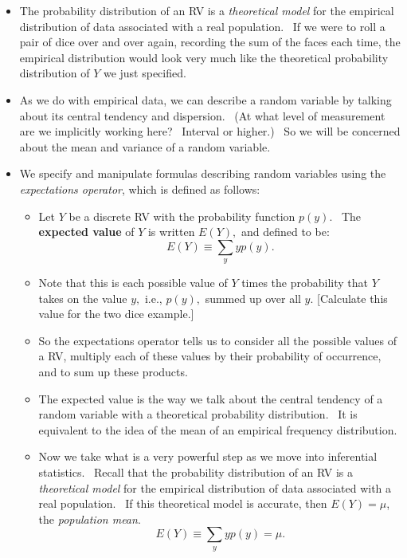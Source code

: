 \documentclass[11pt]{article}
\begin{document}
\begin{itemize}
\item The probability distribution of an RV is a \textit{theoretical model }%
for the empirical distribution of data associated with a real population. \
If we were to roll a pair of dice over and over again, recording the sum of
the faces each time, the empirical distribution would look very much like
the theoretical probability distribution of $Y$ we just specified.

\item As we do with empirical data, we can describe a random variable by
talking about its central tendency and dispersion. \ (At what level of
measurement are we implicitly working here? \ Interval or higher.) \ So we
will be concerned about the mean and variance of a random variable.

\item We specify and manipulate formulas describing random variables using
the \textit{expectations operator}, which is defined as follows:

\begin{itemize}
\item Let $Y$ be a discrete RV with the probability function $p(y)$. \ The 
\textbf{expected value }of $Y$ is written $E(Y),$ and defined to be:%
\begin{equation*}
E(Y)\equiv \sum_{y}yp(y).
\end{equation*}

\item Note that this is each possible value of $Y$ times the probability
that $Y\ $takes on the value $y,$ i.e., $p(y),$ summed up over all $y$.
[Calculate this value for the two dice example.]

\item So the expectations operator tells us to consider all the possible
values of a RV, multiply each of these values by their probability of
occurrence, and to sum up these products.

\item The expected value is the way we talk about the central tendency of a
random variable with a theoretical probability distribution. \ It is
equivalent to the idea of the mean of an empirical frequency distribution.

\item Now we take what is a very powerful step as we move into inferential
statistics. \ Recall that the probability distribution of an RV is a \textit{%
theoretical model }for the empirical distribution of data associated with a
real population. \ If this theoretical model is accurate, then $E(Y)=\mu $,
the \textit{population mean}.%
\begin{equation*}
E(Y)\equiv \sum_{y}yp(y)=\mu .
\end{equation*}


\end{itemize}
\end{itemize}
\end{document}
